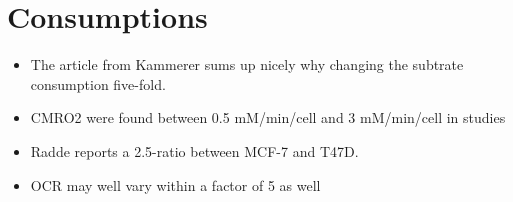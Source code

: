 \documentclass[11pt,a4paper]{article}
\begin{document}
\section{Consumptions}
\begin{itemize}
\item The article from Kammerer sums up nicely why changing the subtrate consumption five-fold.
\item CMRO2 were found between 0.5 mM/min/cell and 3 mM/min/cell in studies \cite{Rhodes1983}\cite{Shalit1972}\cite{Kirsch1978}
\item Radde reports a 2.5-ratio between MCF-7 and T47D.
\item OCR may well vary within a factor of 5 as well 
\end{itemize}

\newpage


\end{document}
